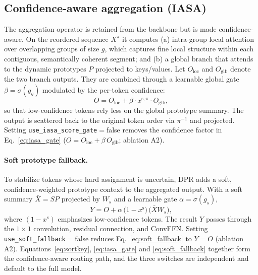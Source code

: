 \subsection{Confidence-aware aggregation (IASA)}
\label{sec:method_iasa}
The aggregation operator is retained from the backbone but is made
confidence-aware. On the reordered sequence $X^{\pi}$ it computes (a) intra-group
local attention over overlapping groups of size $g$, which captures fine local
structure within each contiguous, semantically coherent segment; and (b) a global
branch that attends to the dynamic prototypes $P$ projected to keys/values. Let
$O_{\mathrm{loc}}$ and $O_{\mathrm{glb}}$ denote the two branch outputs. They are
combined through a learnable global gate $\beta=\sigma(g_g)$ modulated by the
per-token confidence:
\begin{equation}
O = O_{\mathrm{loc}} + \beta\cdot x^{\mathrm{s},\pi}\cdot O_{\mathrm{glb}},
\label{eq:iasa_gate}
\end{equation}
so that low-confidence tokens rely less on the global prototype summary. The output
is scattered back to the original token order via $\pi^{-1}$ and projected. Setting
\texttt{use\_iasa\_score\_gate}$=$false removes the confidence factor in
Eq.~\eqref{eq:iasa_gate} ($O = O_{\mathrm{loc}} + \beta\,O_{\mathrm{glb}}$;
ablation A2).

\paragraph{Soft prototype fallback.}
To stabilize tokens whose hard assignment is uncertain, DPR adds a soft,
confidence-weighted prototype context to the aggregated output. With a soft summary
$\bar{X}=S P$ projected by $W_s$ and a learnable gate $\alpha=\sigma(g_s)$,
\begin{equation}
Y = O + \alpha\,\big(1 - x^{\mathrm{s}}\big)\,\big(\bar{X}W_s\big),
\label{eq:soft_fallback}
\end{equation}
where $(1-x^{\mathrm{s}})$ emphasizes low-confidence tokens. The result $Y$ passes
through the $1\times1$ convolution, residual connection, and ConvFFN.
Setting \texttt{use\_soft\_fallback}$=$false reduces Eq.~\eqref{eq:soft_fallback}
to $Y=O$ (ablation A2). Equations~\eqref{eq:sortkey}, \eqref{eq:iasa_gate} and
\eqref{eq:soft_fallback} together form the confidence-aware routing path, and the
three switches are independent and default to the full model.

